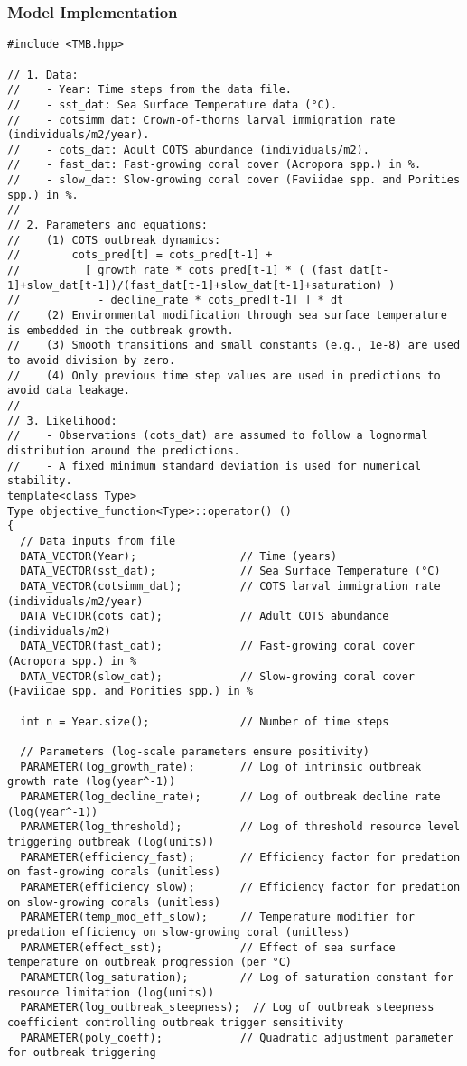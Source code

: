 \subsubsection{Model Implementation}
\begin{lstlisting}
#include <TMB.hpp>

// 1. Data:
//    - Year: Time steps from the data file.
//    - sst_dat: Sea Surface Temperature data (°C).
//    - cotsimm_dat: Crown-of-thorns larval immigration rate (individuals/m2/year).
//    - cots_dat: Adult COTS abundance (individuals/m2).
//    - fast_dat: Fast-growing coral cover (Acropora spp.) in %.
//    - slow_dat: Slow-growing coral cover (Faviidae spp. and Porities spp.) in %.
//
// 2. Parameters and equations:
//    (1) COTS outbreak dynamics:
//        cots_pred[t] = cots_pred[t-1] +
//          [ growth_rate * cots_pred[t-1] * ( (fast_dat[t-1]+slow_dat[t-1])/(fast_dat[t-1]+slow_dat[t-1]+saturation) ) 
//            - decline_rate * cots_pred[t-1] ] * dt
//    (2) Environmental modification through sea surface temperature is embedded in the outbreak growth.
//    (3) Smooth transitions and small constants (e.g., 1e-8) are used to avoid division by zero.
//    (4) Only previous time step values are used in predictions to avoid data leakage.
//
// 3. Likelihood:
//    - Observations (cots_dat) are assumed to follow a lognormal distribution around the predictions.
//    - A fixed minimum standard deviation is used for numerical stability.
template<class Type>
Type objective_function<Type>::operator() ()
{
  // Data inputs from file
  DATA_VECTOR(Year);                // Time (years)
  DATA_VECTOR(sst_dat);             // Sea Surface Temperature (°C)
  DATA_VECTOR(cotsimm_dat);         // COTS larval immigration rate (individuals/m2/year)
  DATA_VECTOR(cots_dat);            // Adult COTS abundance (individuals/m2)
  DATA_VECTOR(fast_dat);            // Fast-growing coral cover (Acropora spp.) in %
  DATA_VECTOR(slow_dat);            // Slow-growing coral cover (Faviidae spp. and Porities spp.) in %

  int n = Year.size();              // Number of time steps

  // Parameters (log-scale parameters ensure positivity)
  PARAMETER(log_growth_rate);       // Log of intrinsic outbreak growth rate (log(year^-1))
  PARAMETER(log_decline_rate);      // Log of outbreak decline rate (log(year^-1))
  PARAMETER(log_threshold);         // Log of threshold resource level triggering outbreak (log(units))
  PARAMETER(efficiency_fast);       // Efficiency factor for predation on fast-growing corals (unitless)
  PARAMETER(efficiency_slow);       // Efficiency factor for predation on slow-growing corals (unitless)
  PARAMETER(temp_mod_eff_slow);     // Temperature modifier for predation efficiency on slow-growing coral (unitless)
  PARAMETER(effect_sst);            // Effect of sea surface temperature on outbreak progression (per °C)
  PARAMETER(log_saturation);        // Log of saturation constant for resource limitation (log(units))
  PARAMETER(log_outbreak_steepness);  // Log of outbreak steepness coefficient controlling outbreak trigger sensitivity
  PARAMETER(poly_coeff);            // Quadratic adjustment parameter for outbreak triggering


\end{lstlisting}
